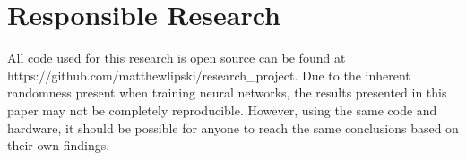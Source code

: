 \section{Responsible Research}\label{sec:responsible-research}
All code used for this research is open source can be found at https://github.com/matthewlipski/research\_project.
Due to the inherent randomness present when training neural networks, the results presented in this paper may not be completely reproducible.
However, using the same code and hardware, it should be possible for anyone to reach the same conclusions based on their own findings.